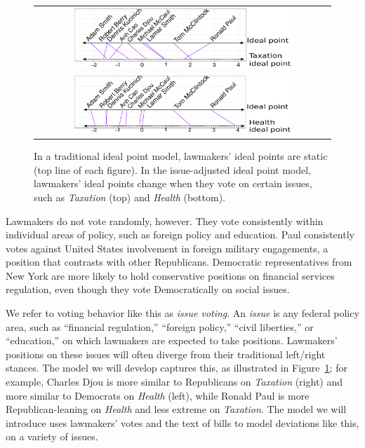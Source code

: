 \begin{figure}
  \center
  \begin{tabular}{c}
  \includegraphics[width=0.75\textwidth]{chapter_spatial_voting_with_text/figures/3393_example_ideal_points_taxation.pdf} \\
  \includegraphics[width=0.75\textwidth]{chapter_spatial_voting_with_text/figures/3393_example_ideal_points_health.pdf} \\
  \end{tabular}
  \caption{In a traditional ideal point model, lawmakers' ideal points
    are static (top line of each figure).  In the issue-adjusted ideal point model, lawmakers'
    ideal points change when they vote on certain issues, such as
    \emph{Taxation} (top) and \emph{Health} (bottom).}
  \label{fig:moving_ideal_points}
\end{figure}

Lawmakers do not vote randomly, however.  They vote consistently
within individual areas of policy, such as foreign policy and
education.  Paul consistently votes against United States involvement
in foreign military engagements, a position that contrasts with other
Republicans.  Democratic representatives from New York are more likely
to hold conservative positions on financial services regulation, even
though they vote Democratically on social issues.

We refer to voting behavior like this as \emph{issue voting}.  An
\emph{issue} is any federal policy area, such as ``financial
regulation,'' ``foreign policy,'' ``civil liberties,'' or
``education,'' on which lawmakers are expected to take positions.
Lawmakers' positions on these issues will often diverge from their
traditional left/right stances.  The model we will develop captures
this, as illustrated in Figure~\ref{fig:moving_ideal_points}; for
example, Charles Djou is more similar to Republicans on
\emph{Taxation} (right) and more similar to Democrats on \emph{Health}
(left), while Ronald Paul is more Republican-leaning on \emph{Health}
and less extreme on \emph{Taxation}. The model we will introduce uses
lawmakers' votes and the text of bills to model deviations like this,
on a variety of issues.

